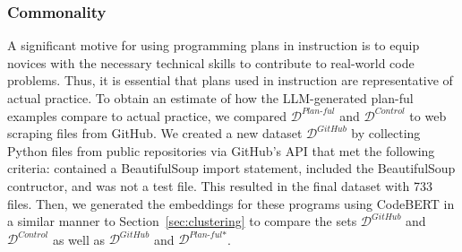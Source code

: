 

\subsubsection{Commonality}
\label{sec:quant_commonality}

A significant motive for using programming plans in instruction is to equip novices with the necessary technical skills to contribute to real-world code problems. Thus, it is essential that plans used in instruction are representative of actual practice.
To obtain an estimate of how the LLM-generated plan-ful examples compare to actual practice, we compared \(\mathcal{D}^{\textit{Plan-ful}}\) and \(\mathcal{D}^{\textit{Control}}\) to web scraping files from GitHub. We created a new dataset \(\mathcal{D}^{\textit{GitHub}}\) by collecting Python files from public repositories via GitHub's API that met the following criteria: contained a BeautifulSoup import statement, included the BeautifulSoup contructor, and was not a test file. 
This resulted in the final dataset with 733 files. Then, we generated the embeddings for these programs using CodeBERT in a similar manner to Section~\ref{sec:clustering} to compare the sets \(\mathcal{D}^{\textit{GitHub}}\) and \(\mathcal{D}^{\textit{Control}}\) as well as \(\mathcal{D}^{\textit{GitHub}}\) and \(\mathcal{D}^{\textit{Plan-ful*}}\).


